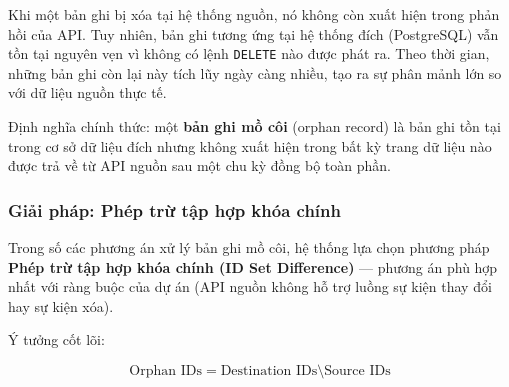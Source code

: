 Khi một bản ghi bị xóa tại hệ thống nguồn, nó không còn xuất hiện trong phản hồi của API. Tuy nhiên, bản ghi tương ứng tại hệ thống đích (PostgreSQL) vẫn tồn tại nguyên vẹn vì không có lệnh \texttt{DELETE} nào được phát ra. Theo thời gian, những bản ghi còn lại này tích lũy ngày càng nhiều, tạo ra sự phân mảnh lớn so với dữ liệu nguồn thực tế.



Định nghĩa chính thức: một \textbf{bản ghi mồ côi} (orphan record) là bản ghi tồn tại trong cơ sở dữ liệu đích nhưng không xuất hiện trong bất kỳ trang dữ liệu nào được trả về từ API nguồn sau một chu kỳ đồng bộ toàn phần.

\subsubsection{Giải pháp: Phép trừ tập hợp khóa chính}

Trong số các phương án xử lý bản ghi mồ côi, hệ thống lựa chọn phương pháp \textbf{Phép trừ tập hợp khóa chính (ID Set Difference)} — phương án phù hợp nhất với ràng buộc của dự án (API nguồn không hỗ trợ luồng sự kiện thay đổi hay sự kiện xóa).

Ý tưởng cốt lõi:

\begin{equation}
    \text{Orphan IDs} = \text{Destination IDs} \setminus \text{Source IDs}
\end{equation}

